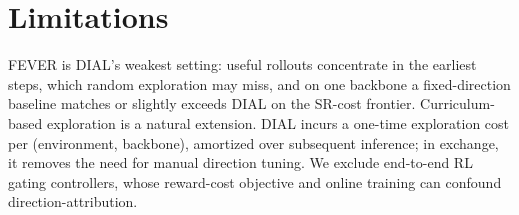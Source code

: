 \section{Limitations}
\label{sec:discussion}

FEVER is DIAL's weakest setting: useful rollouts concentrate in the earliest steps, which random exploration may miss, and on one backbone a fixed-direction baseline matches or slightly exceeds DIAL on the SR-cost frontier. Curriculum-based exploration is a natural extension. DIAL incurs a one-time exploration cost per (environment, backbone), amortized over subsequent inference; in exchange, it removes the need for manual direction tuning. We exclude end-to-end RL gating controllers, whose reward-cost objective and online training can confound direction-attribution.